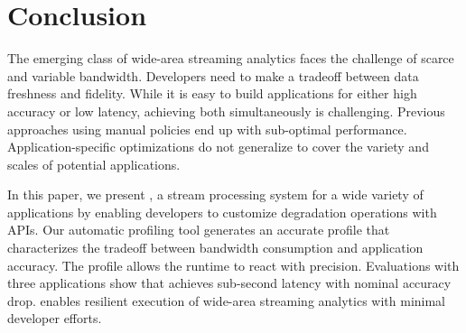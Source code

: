 \section{Conclusion}
\label{sec:conclusion}

The emerging class of wide-area streaming analytics faces the challenge of
scarce and variable bandwidth. Developers need to make a tradeoff between data
freshness and fidelity. While it is easy to build applications for either high
accuracy or low latency, achieving both simultaneously is challenging. Previous
approaches using manual policies end up with sub-optimal
performance. Application-specific optimizations do not generalize to cover the
variety and scales of potential applications.

In this paper, we present \sysname{}, a stream processing system for a wide
variety of applications by enabling developers to customize degradation
operations with \maybe{} APIs. Our automatic profiling tool generates an
accurate profile that characterizes the tradeoff between bandwidth consumption
and application accuracy. The profile allows the runtime to react with
precision. Evaluations with three applications show that \sysname{} achieves
sub-second latency with nominal accuracy drop. \sysname{} enables resilient
execution of wide-area streaming analytics with minimal developer efforts.


